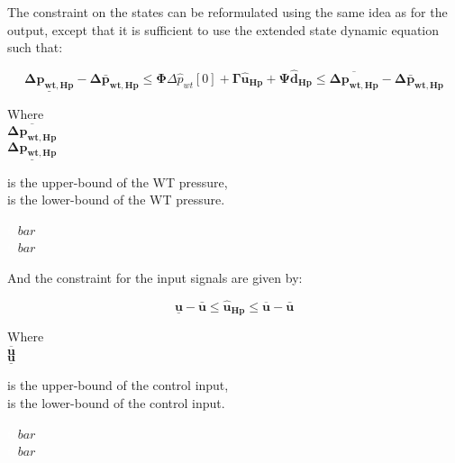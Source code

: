 
The constraint on the states can be reformulated using the same idea as for the output, except that it is sufficient to use the extended state dynamic equation such that: 

\begin{equation}
	\underline{\bm{\Delta p_{wt,Hp}}} - \bm{\Delta \bar{p}_{wt,Hp}} \leq \bm{\Phi} \Delta \hat{p}_{wt}[0] +   \bm{\Gamma} \bm{\hat{u}_{Hp}} + \bm{\Psi}  \bm{\hat{d}_{Hp}} \leq \overline{\bm{\Delta p_{wt,Hp}}} - \bm{\Delta \bar{p}_{wt,Hp}} 
	\label{eq:stateconstraint}
\end{equation}

\begin{minipage}[t]{0.20\textwidth}
Where\\
\hspace*{8mm} $ \overline{\bm{\Delta p_{wt,Hp}}} $ \\
\hspace*{8mm} $ \underline{\bm{\Delta p_{wt,Hp}}} $ 
\end{minipage}
\begin{minipage}[t]{0.68\textwidth}
\vspace*{2mm}
is the upper-bound of the WT pressure, \\
is the lower-bound of the WT pressure. 
\end{minipage}
\begin{minipage}[t]{0.10\textwidth}
\vspace*{1.8mm}
\textcolor{White}{te}$\unit{bar}$\\
\textcolor{White}{te}$\unit{bar}$
\end{minipage}

And the constraint for the input signals are given by: 

\begin{equation}
\underline{\bm{u}} - \bm{\bar{u}} \leq \bm{\hat{u}_{Hp}} \leq \overline{\bm{{u}}} - \bm{\bar{u}}
\label{eq:inputconstraint}
\end{equation}

\begin{minipage}[t]{0.20\textwidth}
Where\\
\hspace*{8mm} $ \overline{\bm{u}} $ \\
\hspace*{8mm} $ \underline{\bm{u}} $ 
\end{minipage}
\begin{minipage}[t]{0.68\textwidth}
\vspace*{2mm}
is the upper-bound of the control input, \\
is the lower-bound of the control input. 
\end{minipage}
\begin{minipage}[t]{0.10\textwidth}
\vspace*{1.8mm}
\textcolor{White}{te}$\unit{bar}$\\
\textcolor{White}{te}$\unit{bar}$
\end{minipage}


